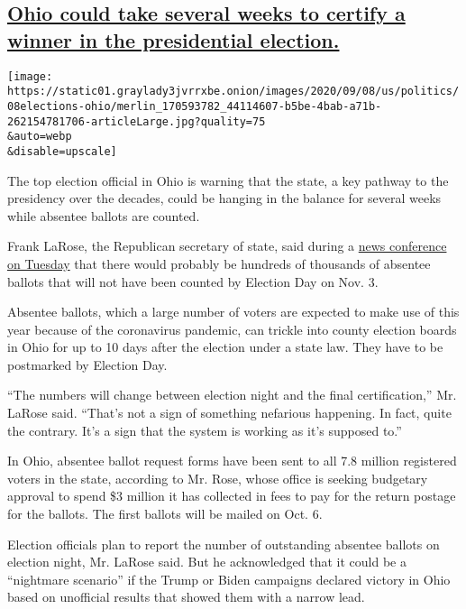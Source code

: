 \hypertarget{ohio-could-take-several-weeks-to-certify-a-winner-in-the-presidential-election}{%
\subsection{\texorpdfstring{\protect\hyperlink{ohio-could-take-several-weeks-to-certify-a-winner-in-the-presidential-election}{Ohio
could take several weeks to certify a winner in the presidential
election.}}{Ohio could take several weeks to certify a winner in the presidential election.}}\label{ohio-could-take-several-weeks-to-certify-a-winner-in-the-presidential-election}}

\texttt{[image: https://static01.graylady3jvrrxbe.onion/images/2020/09/08/us/politics/08elections-ohio/merlin\_170593782\_44114607-b5be-4bab-a71b-262154781706-articleLarge.jpg?quality=75\\\&auto=webp\\\&disable=upscale]}

The top election official in Ohio is warning that the state, a key
pathway to the presidency over the decades, could be hanging in the
balance for several weeks while absentee ballots are counted.

Frank LaRose, the Republican secretary of state, said during a
\href{https://www.youtube.com/watch?v=WHN2Ol58SEA}{news conference on
Tuesday} that there would probably be hundreds of thousands of absentee
ballots that will not have been counted by Election Day on Nov. 3.

Absentee ballots, which a large number of voters are expected to make
use of this year because of the coronavirus pandemic, can trickle into
county election boards in Ohio for up to 10 days after the election
under a state law. They have to be postmarked by Election Day.

``The numbers will change between election night and the final
certification,'' Mr. LaRose said. ``That's not a sign of something
nefarious happening. In fact, quite the contrary. It's a sign that the
system is working as it's supposed to.''

In Ohio, absentee ballot request forms have been sent to all 7.8 million
registered voters in the state, according to Mr. Rose, whose office is
seeking budgetary approval to spend \$3 million it has collected in fees
to pay for the return postage for the ballots. The first ballots will be
mailed on Oct. 6.

Election officials plan to report the number of outstanding absentee
ballots on election night, Mr. LaRose said. But he acknowledged that it
could be a ``nightmare scenario'' if the Trump or Biden campaigns
declared victory in Ohio based on unofficial results that showed them
with a narrow lead.

